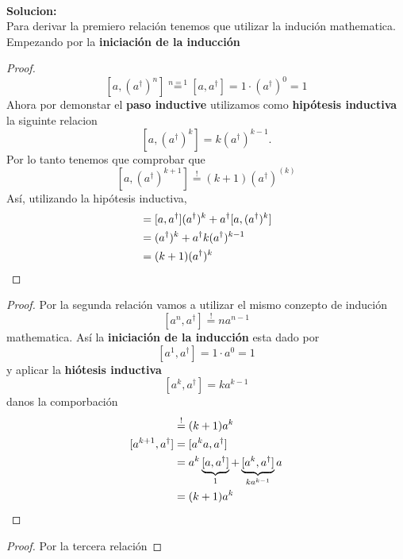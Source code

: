\begin{enumerate}
 \\
\textbf{Solucion:} \\
Para derivar la premiero relación tenemos que utilizar la indución mathematica.
Empezando por la \textbf{iniciación de la inducción}
\begin{proof}
$$
	[a, (a^\dagger)^n] \overset{n=1}{=} [a, a^\dagger] = 1 \cdot (a^\dagger)^0 =
1 
$$
Ahora por demonstar el \textbf{paso inductive} utilizamos como
\textbf{hipótesis inductiva} la siguinte relacion
$$
	[a, (a^\dagger)^k] = k (a^\dagger)^{k-1}.
$$
Por lo tanto tenemos que comprobar que
$$
	[a, (a^\dagger)^{k+1}] \overset{!}{=} (k+1) (a^\dagger)^{(k)}
$$
Así, utilizando la hipótesis inductiva,
\begin{align*}
	[a, a^\dagger (a^\dagger)^k] &= [a, a^\dagger] (a^\dagger)^k + a^\dagger [a,
(a^\dagger)^k] \\
	&= (a^\dagger)^k + a^\dagger k (a^\dagger)^{k-1} \\
	&= (k+1)(a^\dagger)^k \qedhere
\end{align*}
\end{proof}
\begin{proof}
Por la segunda relación vamos a utilizar el mismo conzepto de indución
$$
	[a^n, a^\dagger] \overset{!}{=} n a^{n-1}
$$
mathematica. Así la \textbf{iniciación de la inducción} esta dado por
$$
	[a^1, a^\dagger] = 1 \cdot a^0 = 1
$$
y aplicar la \textbf{hiótesis inductiva} 
$$
	[a^k, a^\dagger] = k a^{k-1}
$$
danos la comporbación
\begin{align*}
	[a^{k+1}, a^\dagger] &\overset{!}{=} (k+1)a^k \\
	[a^{k+1}, a^\dagger] &= [a^k a, a^\dagger] \\
	&=	a^k \underbrace{[a, a^\dagger]}_1 + \underbrace{[a^k,
a^\dagger]}_{ka^{k-1}} a \\
	&= (k+1)a^k \qedhere
\end{align*}
\end{proof}
\begin{proof}
Por la tercera relación

\end{proof}
\end{enumerate}
